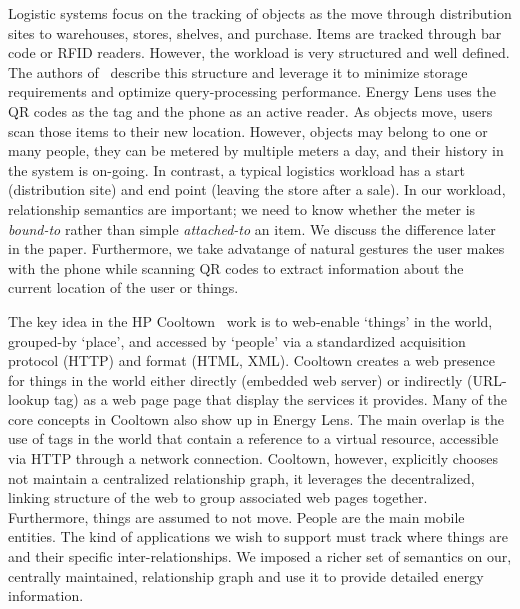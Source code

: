 Logistic systems focus on the tracking of objects as the move through distribution sites to warehouses, stores, shelves,
and purchase.  Items are tracked through bar code or RFID readers.  However, the workload is very structured and well
defined.  The authors of~\cite{rfid_gonz2006} describe this structure and leverage it to minimize storage
requirements and optimize query-processing performance.  Energy Lens uses the QR codes as the tag and the phone as an active
reader.  As objects move, users scan those items to their new location.  However, objects may belong to one or
many people, they can be metered by multiple meters a day, and their history in the system
is on-going.  In contrast, a typical logistics workload has a start (distribution site) and end point (leaving the store
after a sale).  In our workload, relationship semantics are important; we need to know whether the meter is \emph{bound-to}
rather than simple \emph{attached-to} an item.  We discuss the difference later in the paper.
Furthermore, we take advatange of natural gestures the user makes with the phone while scanning QR codes to extract
information about the current location of the user or things.

The key idea in the HP Cooltown~\cite{bridgingphysical,cooltown} work is to web-enable `things' in the world, grouped-by
`place', and accessed by `people' via a standardized acquisition protocol (HTTP) and format (HTML, XML).  
Cooltown creates a web presence for things in the world either directly (embedded web server) or indirectly 
(URL-lookup tag) as a web page page that display the services it provides.  Many of the core concepts in Cooltown 
also show up in Energy Lens.  The main overlap is the use of tags in the world that contain a reference to a virtual 
resource, accessible via HTTP through
a network connection.  Cooltown, however, explicitly chooses not maintain a centralized relationship
graph, it leverages the decentralized, linking structure of the web to group associated web pages together.
Furthermore, things are assumed to not move.  People are the main mobile entities.  The kind of applications
we wish to support must track where things are and their specific inter-relationships.  We imposed a richer set of 
semantics on our, centrally maintained, relationship graph and use it to provide detailed energy information.

